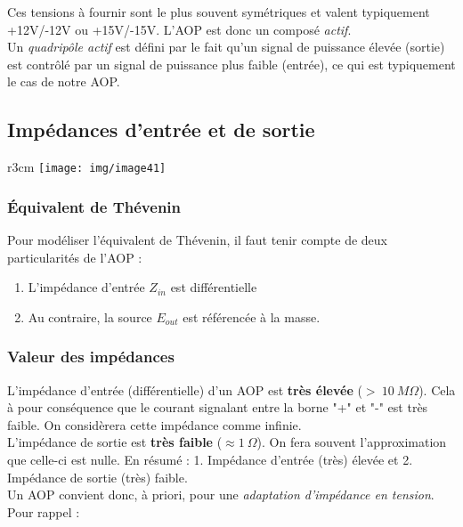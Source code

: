 Ces tensions à fournir sont le plus souvent symétriques et valent typiquement +12V/-12V ou +15V/-15V. L'AOP est donc un composé \textit{actif}.\\

Un \textit{quadripôle actif} est défini par le fait qu'un signal de puissance élevée (sortie) est contrôlé par un signal de puissance plus faible (entrée), ce qui est typiquement le cas de notre AOP.\\




\newpage

\subsection{Impédances d'entrée et de sortie}\begin{wrapfigure}[1]{r}{3cm}
\texttt{[image: img/image41]}
\end{wrapfigure}
\subsubsection{Équivalent de Thévenin}

Pour modéliser l'équivalent de Thévenin, il faut tenir compte de deux particularités de l'AOP :
\begin{enumerate}
	\item L'impédance d'entrée $Z_{in}$ est différentielle
	\item Au contraire, la source $E_{out}$ est référencée à la masse.
\end{enumerate}


\subsubsection{Valeur des impédances}
L'impédance d'entrée (différentielle) d'un AOP est \textbf{très élevée} ($>\ 10\ M\Omega$). Cela à pour conséquence que le courant signalant entre la borne "+" et "-" est très faible. On considèrera cette impédance comme infinie.\\
L'impédance de sortie est \textbf{très faible} ($\approx 1\ \Omega$). On fera souvent l'approximation que celle-ci est nulle. En résumé : 1. Impédance d'entrée (très) élevée et 2. Impédance de sortie (très) faible.\\
Un AOP convient donc, à priori, pour une \textit{adaptation d'impédance en tension}. Pour rappel :\\

